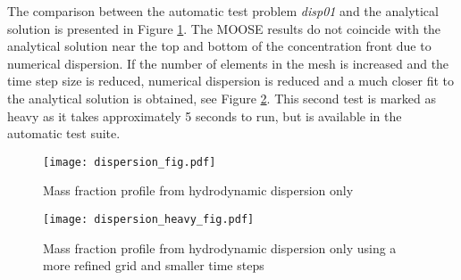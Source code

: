 The comparison between the automatic test problem \emph{disp01} and the analytical solution is presented in Figure \ref{fig:disp}. The MOOSE results do not coincide with the analytical solution near the top and bottom of the concentration front due to numerical dispersion. If the number of elements in the mesh is increased and the time step size is reduced, numerical dispersion is reduced and a much closer fit to the analytical solution is obtained, see Figure \ref{fig:dispheavy}. This second test is marked as heavy as it takes approximately 5 seconds to run, but is available in the automatic test suite.
\begin{figure}[htb]
\centering
\texttt{[image: dispersion\_fig.pdf]}
\caption{Mass fraction profile from hydrodynamic dispersion only}
\label{fig:disp}
\end{figure}

\begin{figure}[htb]
\centering
\texttt{[image: dispersion\_heavy\_fig.pdf]}
\caption{Mass fraction profile from hydrodynamic dispersion only using a more refined grid and smaller time steps}
\label{fig:dispheavy}
\end{figure}
